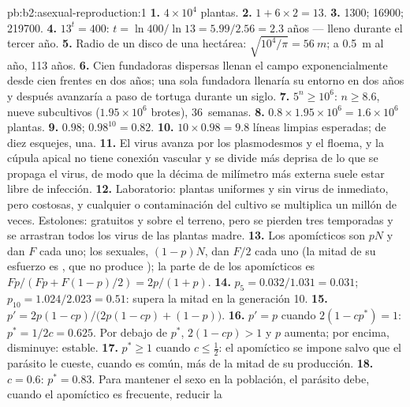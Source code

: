 \begin{solution}{pb:b2:asexual-reproduction:1}
\textbf{1.} $4\times 10^{4}$ plantas.
\textbf{2.} $1 + 6\times 2 = 13$.
\textbf{3.} \num{1300}; \num{16900}; \num{219700}.
\textbf{4.} $13^{t} = 400$: $t = \ln 400/\ln 13 = 5.99/2.56 = 2.3$
años --- lleno durante el tercer año.
\textbf{5.} Radio de un disco de una hectárea:
$\sqrt{10^{4}/\pi} = \qty{56}{m}$; a \qty{0.5}{m} al año, \num{113} años.
\textbf{6.} Cien fundadoras dispersas llenan el campo exponencialmente
desde cien frentes en dos años; una sola fundadora llenaría su entorno en
dos años y después avanzaría a paso de tortuga durante un siglo.
\textbf{7.} $5^{n} \ge 10^{6}$: $n \ge 8.6$, nueve subcultivos
($1.95\times 10^{6}$ brotes), 36~semanas.
\textbf{8.} $0.8\times 1.95\times 10^{6} = 1.6\times 10^{6}$ plantas.
\textbf{9.} $0.98$; $0.98^{10} = 0.82$.
\textbf{10.} $10\times 0.98 = 9.8$ líneas limpias esperadas; de diez
esquejes, una.
\textbf{11.} El virus avanza por los plasmodesmos y el floema, y la cúpula
apical no tiene conexión vascular y se divide más deprisa de lo que se
propaga el virus, de modo que la décima de milímetro más externa suele
estar libre de infección.
\textbf{12.} Laboratorio: plantas uniformes y sin virus de inmediato, pero
costosas, y cualquier  o contaminación del cultivo se multiplica
un millón de veces. Estolones: gratuitos y sobre el terreno, pero se
pierden tres temporadas y se arrastran todos los virus de las plantas
madre.
\textbf{13.} Los apomícticos son $pN$ y dan $F$  cada uno; los
sexuales, $(1 - p)N$, dan $F/2$  cada uno (la mitad de su
esfuerzo es , que no produce ); la parte de  de los
apomícticos es $Fp/(Fp + F(1 - p)/2)
= 2p/(1 + p)$.
\textbf{14.} $p_5 = 0.032/1.031 = 0.031$; $p_{10} = 1.024/2.023 =
0.51$: supera la mitad en la generación 10.
\textbf{15.} $p' = 2p(1 - cp)/\bigl(2p(1 - cp) + (1 - p)\bigr)$.
\textbf{16.} $p' = p$ cuando $2(1 - cp^*) = 1$: $p^* = 1/2c = 0.625$.
Por debajo de $p^*$, $2(1 - cp) > 1$ y $p$ aumenta; por encima,
disminuye: estable.
\textbf{17.} $p^* \ge 1$ cuando $c \le \tfrac12$: el apomíctico se impone
salvo que el parásito le cueste, cuando es común, más de la mitad de su
producción.
\textbf{18.} $c = 0.6$: $p^* = 0.83$. Para mantener el sexo en la
población, el parásito debe, cuando el apomíctico es frecuente, reducir la

\end{solution}
